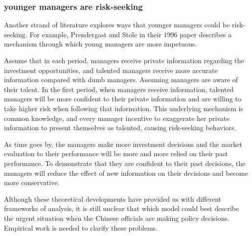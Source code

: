 \documentclass{article}
\begin{document}
\begin{CJK}{UTF8}{gbsn}
\subsubsection{younger managers are risk-seeking}
Another strand of literature explores ways that younger managers could be risk-seeking. For example, Prendergast and Stole in their 1996 paper\cite{impetuous} describes a mechanism through which young managers are more impetuous. 

Assume that in each period, managers receive private information regarding the investment opportunities, and talented managers receive more accurate information compared with dumb managers. Assuming managers are aware of their talent. In the first period, when managers receive information, talented managers will be more confident to their private information and are willing to take higher risk when following that information. This underlying mechanism is common knowledge, and every manager incentive to exaggerate her private information to present themselves as talented, causing risk-seeking behaviors. 

As time goes by, the managers make more investment decisions and the market evaluation to their performance will be more and more relied on their past performance. To demonstrate that they are confident to their past decisions, the managers will reduce the effect of new information on their decisions and become more conservative. 



Although these theoretical developments have provided us with different frameworks of analysis, it is still unclear that which model could best describe the urgent situation when the Chinese officials are making policy decisions. Empirical work is needed to clarify these problems.



\end{CJK}
\end{document}
